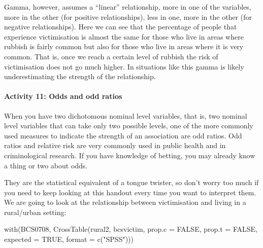 \documentclass[
]{book}
\newenvironment{Shaded}{\begin{snugshade}}{\end{snugshade}}
\newcommand{\AttributeTok}[1]{\textcolor[rgb]{0.77,0.63,0.00}{#1}}
\newcommand{\ConstantTok}[1]{\textcolor[rgb]{0.00,0.00,0.00}{#1}}
\newcommand{\FunctionTok}[1]{\textcolor[rgb]{0.00,0.00,0.00}{#1}}
\newcommand{\NormalTok}[1]{#1}
\newcommand{\StringTok}[1]{\textcolor[rgb]{0.31,0.60,0.02}{#1}}
\begin{document}
Gamma, however, assumes a ``linear'' relationship, more in one of the variables, more in the other (for positive relationships), less in one, more in the other (for negative relationships). Here we can see that the percentage of people that experience victimisation is almost the same for those who live in areas where rubbish is fairly common but also for those who live in areas where it is very common. That is, once we reach a certain level of rubbish the risk of victimisation does not go much higher. In situations like this gamma is likely underestimating the strength of the relationship.

\hypertarget{activity-11-odds-and-odd-ratios}{%
\paragraph{Activity 11: Odds and odd ratios}\label{activity-11-odds-and-odd-ratios}}

When you have two dichotomous nominal level variables, that is, two nominal level variables that can take only two possible levels, one of the more commonly used measures to indicate the strength of an association are odd ratios. Odd ratios and relative risk are very commonly used in public health and in criminological research. If you have knowledge of betting, you may already know a thing or two about odds.

They are the statistical equivalent of a tongue twister, so don't worry too much if you need to keep looking at this handout every time you want to interpret them. We are going to look at the relationship between victimisation and living in a rural/urban setting:

\begin{Shaded}
\begin{Highlighting}[]
\FunctionTok{with}\NormalTok{(BCS0708, }\FunctionTok{CrossTable}\NormalTok{(rural2, bcsvictim, }\AttributeTok{prop.c =} \ConstantTok{FALSE}\NormalTok{, }\AttributeTok{prop.t =} \ConstantTok{FALSE}\NormalTok{, }\AttributeTok{expected =} \ConstantTok{TRUE}\NormalTok{, }\AttributeTok{format =} \FunctionTok{c}\NormalTok{(}\StringTok{"SPSS"}\NormalTok{)))}
\end{Highlighting}
\end{Shaded}
\end{document}
